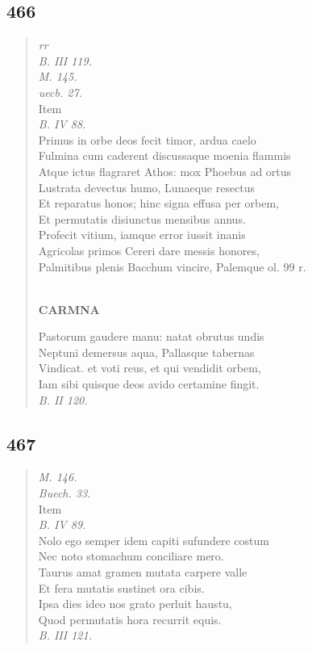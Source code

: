 \documentclass[11pt, a4paper]{report}
\begin{document}
            \subsection*{466}
      \begin{verse}
      \textit{rr} \\ \textit{B. III 119.} \\ \textit{M. 145.} \\ \textit{uecb. 27.} \\ Item \\ \textit{B. IV 88.} \\ Primus in orbe deos fecit timor, ardua caelo \\ Fulmina cum caderent discussaque moenia flammis \\ Atque ictus flagraret Athos: mox Phoebus ad ortus \\ Lustrata devectus humo, Lunaeque resectus \\ Et reparatus honos; hinc signa effusa per orbem, \\ Et permutatis disiunctus mensibus annus. \\ Profecit vitium, iamque error iussit inanis \\ Agricolas primos Cereri dare messis honores, \\ Palmitibus plenis Bacchum vincire, Palemque ol. 99 r. \\ 
        ﻿\pagebreak 
     \marginpar{[344]} \begin{center} \textbf{CARMNA} \end{center}Pastorum gaudere manu: natat obrutus undis \\ Neptuni demersus aqua, Pallasque tabernas \\ Vindicat. et voti reus, et qui vendidit orbem, \\ Iam sibi quisque deos avido certamine fingit. \\ \textit{B. II 120.} \\ 
      \end{verse}
  
            \subsection*{467}
      \begin{verse}
      \textit{M. 146.} \\ \textit{Buech. 33.} \\ Item \\ \textit{B. IV 89.} \\ Nolo ego semper idem capiti sufundere costum \\ Nec noto stomachum conciliare mero. \\ Taurus amat gramen mutata carpere valle \\ Et fera mutatis sustinet ora cibis. \\ Ipsa dies ideo nos grato perluit haustu, \\ Quod permutatis hora recurrit equis. \\ \textit{B. III 121.} \\ 
      \end{verse}
  
\end{document}

